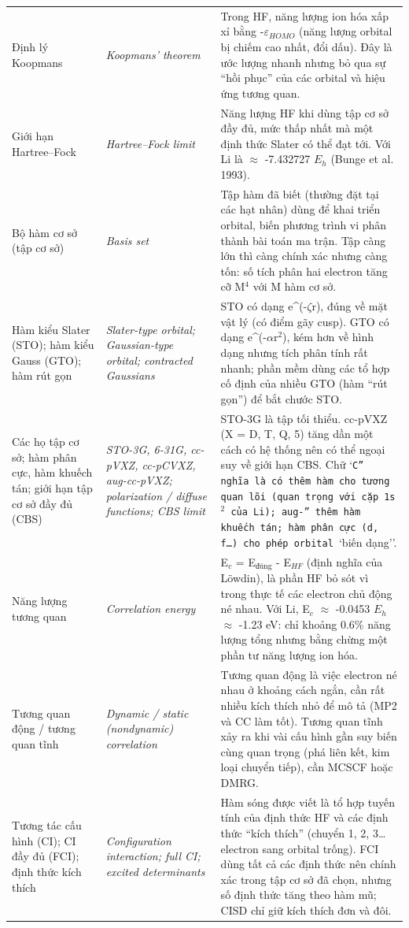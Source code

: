 \begin{longtable}{@{}>{\raggedright\arraybackslash}p{}>{\raggedright\arraybackslash\itshape}p{}>{\raggedright\arraybackslash}p{}@{}}
Định lý Koopmans & Koopmans' theorem & Trong HF, năng lượng ion hóa xấp xỉ bằng -$\varepsilon_{HOMO}$ (năng lượng orbital bị chiếm cao nhất, đổi dấu). Đây là ước lượng nhanh nhưng bỏ qua sự ``hồi phục'' của các orbital và hiệu ứng tương quan. \\[2pt]
Giới hạn Hartree–Fock & Hartree–Fock limit & Năng lượng HF khi dùng tập cơ sở đầy đủ, mức thấp nhất mà một định thức Slater có thể đạt tới. Với Li là $\approx$ -7.432727 $E_h$ (Bunge et al. 1993). \\[2pt]
Bộ hàm cơ sở (tập cơ sở) & Basis set & Tập hàm đã biết (thường đặt tại các hạt nhân) dùng để khai triển orbital, biến phương trình vi phân thành bài toán ma trận. Tập càng lớn thì càng chính xác nhưng càng tốn: số tích phân hai electron tăng cỡ M$^{4}$ với M hàm cơ sở. \\[2pt]
Hàm kiểu Slater (STO); hàm kiểu Gauss (GTO); hàm rút gọn & Slater-type orbital; Gaussian-type orbital; contracted Gaussians & STO có dạng e\textasciicircum{}(-$\zeta$r), đúng về mặt vật lý (có điểm gãy cusp). GTO có dạng e\textasciicircum{}(-$\alpha$r$^{2}$), kém hơn về hình dạng nhưng tích phân tính rất nhanh; phần mềm dùng các tổ hợp cố định của nhiều GTO (hàm ``rút gọn'') để bắt chước STO. \\[2pt]
Các họ tập cơ sở; hàm phân cực, hàm khuếch tán; giới hạn tập cơ sở đầy đủ (CBS) & STO-3G, 6-31G\*, cc-pVXZ, cc-pCVXZ, aug-cc-pVXZ; polarization / diffuse functions; CBS limit & STO-3G là tập tối thiểu. cc-pVXZ (X = D, T, Q, 5) tăng dần một cách có hệ thống nên có thể ngoại suy về giới hạn CBS. Chữ `\texttt{C'' nghĩa là có thêm hàm cho tương quan lõi (quan trọng với cặp 1s$^{2}$ của Li); }\texttt{aug-'' thêm hàm khuếch tán; hàm phân cực (d, f…) cho phép orbital }`biến dạng''. \\[2pt]
Năng lượng tương quan & Correlation energy & E$_{c}$ = E$_{\text{đúng}}$ - E$_{HF}$ (định nghĩa của Löwdin), là phần HF bỏ sót vì trong thực tế các electron chủ động né nhau. Với Li, E$_{c}$ $\approx$ -0.0453 $E_h$ $\approx$ -1.23 eV: chỉ khoảng 0.6\% năng lượng tổng nhưng bằng chừng một phần tư năng lượng ion hóa. \\[2pt]
Tương quan động / tương quan tĩnh & Dynamic / static (nondynamic) correlation & Tương quan động là việc electron né nhau ở khoảng cách ngắn, cần rất nhiều kích thích nhỏ để mô tả (MP2 và CC làm tốt). Tương quan tĩnh xảy ra khi vài cấu hình gần suy biến cùng quan trọng (phá liên kết, kim loại chuyển tiếp), cần MCSCF hoặc DMRG. \\[2pt]
Tương tác cấu hình (CI); CI đầy đủ (FCI); định thức kích thích & Configuration interaction; full CI; excited determinants & Hàm sóng được viết là tổ hợp tuyến tính của định thức HF và các định thức ``kích thích'' (chuyển 1, 2, 3… electron sang orbital trống). FCI dùng tất cả các định thức nên chính xác trong tập cơ sở đã chọn, nhưng số định thức tăng theo hàm mũ; CISD chỉ giữ kích thích đơn và đôi. \\[2pt]

\end{longtable}
